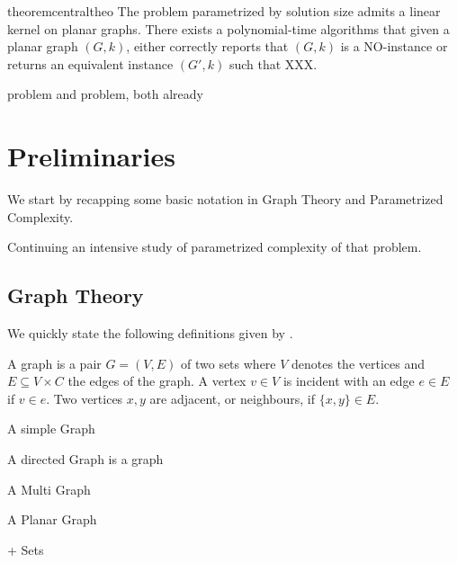\begin{restatable}[]{theorem}{centraltheo}\label{thm:central}
    The \sdom problem parametrized by solution size admits a linear kernel on planar graphs. There exists a polynomial-time algorithms that given a planar graph $(G, k)$, either correctly reports that $(G, k)$ is a NO-instance or returns an equivalent instance $(G', k)$ such that XXX.
\end{restatable}

 \dom problem and \tdom problem, both already 

\chapter{Preliminaries}
We start by recapping some basic notation in Graph Theory and Parametrized Complexity. 

Continuing an intensive study of parametrized complexity of that problem. 

\section{Graph Theory}
We quickly state the following definitions given by {\cite[p.~xxx]{diestel10}}.

\begin{definition}[Graph]
A graph is a pair $G = (V, E)$ of two sets where $V$ denotes the vertices and $E \subseteq V \times C$ the edges of the graph.  A vertex $v \in V$ is incident with an edge $e \in E$ if $v \in e$. Two vertices $x, y$ are adjacent, or neighbours, if $\{x,y \} \in E$.
\end{definition}

\begin{definition}
    A simple Graph

    A directed Graph is a graph

    A Multi Graph

    A Planar Graph
\end{definition}

\begin{definition}
\end{definition}

\begin{definition}
+ Sets
\end{definition}

